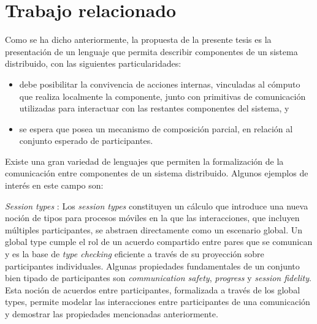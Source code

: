 \section{Trabajo relacionado}
\label{trabajo-relacionado}
Como se ha dicho anteriormente, la propuesta de la presente tesis es la presentación de un lenguaje que permita describir componentes de un sistema distribuido, con las siguientes particularidades: 
\begin{itemize}
\item debe posibilitar la convivencia de acciones internas, vinculadas al cómputo que realiza localmente la componente, junto con primitivas de comunicación utilizadas para interactuar con las restantes componentes del sistema, y
\item se espera que posea un mecanismo de composición parcial, en relación al conjunto esperado de participantes.
\end{itemize}

Existe una gran variedad de lenguajes que permiten la formalización de la comunicación entre componentes de un sistema distribuido. Algunos ejemplos de interés en este campo son:


\emph{Session types} \cite{honda:esop98,honda:popl08}: Los \emph{session types} constituyen un cálculo que introduce una nueva noción de tipos para procesos móviles en la que las interacciones, que incluyen múltiples participantes, se abstraen directamente como un escenario global. Un global type cumple el rol de un acuerdo compartido entre pares que se comunican y es la base de \emph{type checking} eficiente a través de su proyección sobre participantes individuales. Algunas propiedades fundamentales de un conjunto bien tipado de participantes son \emph{communication safety}, \emph{progress} y \emph{session fidelity}. Esta noción de acuerdos entre participantes, formalizada a través de los global types, permite modelar las interacciones entre participantes de una comunicación y demostrar las propiedades mencionadas anteriormente.\\

